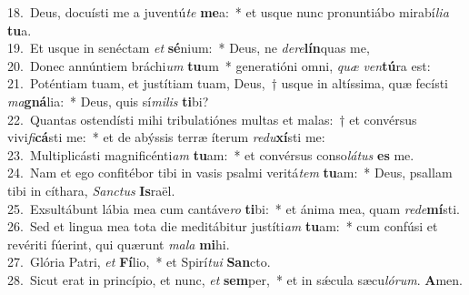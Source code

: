 {18.~}Deus, docuísti me a juventú\textit{te} \textbf{me}a:~* et usque nunc pronuntiábo mirabí\textit{li}\textit{a} \textbf{tu}a.\\
{19.~}Et usque in senéctam \textit{et} \textbf{sé}nium:~* Deus, ne \textit{de}\textit{re}\textbf{lín}quas me,\\
{20.~}Donec annúntiem bráchi\textit{um} \textbf{tu}um~* generatióni omni, \textit{quæ} \textit{ven}\textbf{tú}ra est:\\
{21.~}Poténtiam tuam, et justítiam tuam, Deus,~† usque in altíssima, quæ fecísti \textit{ma}\textbf{gná}lia:~* Deus, quis sí\textit{mi}\textit{lis} \textbf{ti}bi?\\
{22.~}Quantas ostendísti mihi tribulatiónes multas et malas:~† et convérsus vivi\textit{fi}\textbf{cá}sti me:~* et de abýssis terræ íterum \textit{re}\textit{du}\textbf{xí}sti me:\\
{23.~}Multiplicásti magnificénti\textit{am} \textbf{tu}am:~* et convérsus conso\textit{lá}\textit{tus} \textbf{es} me.\\
{24.~}Nam et ego confitébor tibi in vasis psalmi veritá\textit{tem} \textbf{tu}am:~* Deus, psallam tibi in cíthara, \textit{San}\textit{ctus} \textbf{Is}raël.\\
{25.~}Exsultábunt lábia mea cum cantáve\textit{ro} \textbf{ti}bi:~* et ánima mea, quam \textit{re}\textit{de}\textbf{mí}sti.\\
{26.~}Sed et lingua mea tota die meditábitur justíti\textit{am} \textbf{tu}am:~* cum confúsi et revériti fúerint, qui quærunt \textit{ma}\textit{la} \textbf{mi}hi.\\
{27.~}Glória Patri, \textit{et} \textbf{Fí}lio,~* et Spirí\textit{tu}\textit{i} \textbf{San}cto.\\
{28.~}Sicut erat in princípio, et nunc, \textit{et} \textbf{sem}per,~* et in sǽcula sæcu\textit{ló}\textit{rum}. \textbf{A}men.\\
